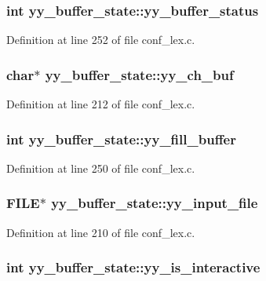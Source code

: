 \subsubsection[{yy\_\-buffer\_\-status}]{\setlength{\rightskip}{0pt plus 5cm}int {\bf yy\_\-buffer\_\-state::yy\_\-buffer\_\-status}}\label{structyy__buffer__state_a70fd925d37a2f0454fbd0def675d106c}


Definition at line 252 of file conf\_\-lex.c.
\subsubsection[{yy\_\-ch\_\-buf}]{\setlength{\rightskip}{0pt plus 5cm}char$\ast$ {\bf yy\_\-buffer\_\-state::yy\_\-ch\_\-buf}}\label{structyy__buffer__state_ad7b8df8d8a4688e57b0b8d3ca75adc85}


Definition at line 212 of file conf\_\-lex.c.
\subsubsection[{yy\_\-fill\_\-buffer}]{\setlength{\rightskip}{0pt plus 5cm}int {\bf yy\_\-buffer\_\-state::yy\_\-fill\_\-buffer}}\label{structyy__buffer__state_a63d2afbb1d79a3fc63df9e12626f827d}


Definition at line 250 of file conf\_\-lex.c.
\subsubsection[{yy\_\-input\_\-file}]{\setlength{\rightskip}{0pt plus 5cm}FILE$\ast$ {\bf yy\_\-buffer\_\-state::yy\_\-input\_\-file}}\label{structyy__buffer__state_a4843d1422e3276b636d475a3095bd948}


Definition at line 210 of file conf\_\-lex.c.
\subsubsection[{yy\_\-is\_\-interactive}]{\setlength{\rightskip}{0pt plus 5cm}int {\bf yy\_\-buffer\_\-state::yy\_\-is\_\-interactive}}\label{structyy__buffer__state_abf5c70eea75581b58c0ee7bd31b14490}


